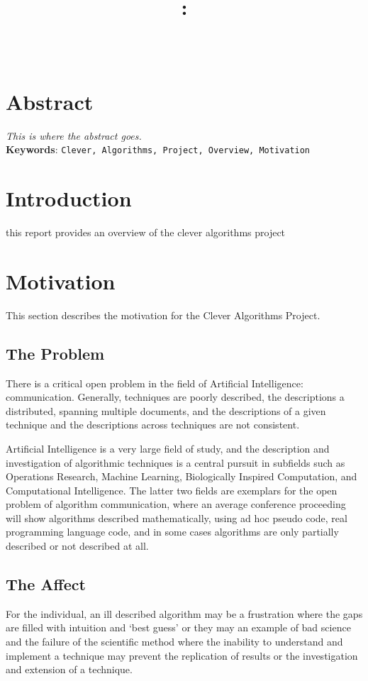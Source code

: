 \documentclass[a4paper, 11pt]{article}
\title{{\myreporttitle}: {\myreportsubtitle}\\{\normalsize\myreportproject}}
\author{\myreportname\\\myreportemail}
\begin{document}
\maketitle

\section*{Abstract} 
\label{sec:abstract}
\emph{This is where the abstract goes.}
\\
\textbf{Keywords}: \texttt{Clever, Algorithms, Project, Overview, Motivation}

\section{Introduction}
\label{sec:introduction}

this report provides an overview of the clever algorithms project

\section{Motivation}
This section describes the motivation for the Clever Algorithms Project.

\subsection{The Problem}
There is a critical open problem in the field of Artificial Intelligence: communication. Generally, techniques are poorly described, the descriptions a distributed, spanning multiple documents, and the descriptions of a given technique and the descriptions across techniques are not consistent. 

Artificial Intelligence is a very large field of study, and the description and investigation of algorithmic techniques is a central pursuit in subfields such as Operations Research, Machine Learning, Biologically Inspired Computation, and Computational Intelligence. The latter two fields are exemplars for the open problem of algorithm communication, where an average conference proceeding will show algorithms described mathematically, using ad hoc pseudo code, real programming language code, and in some cases algorithms are only partially described or not described at all. 

\subsection{The Affect}
For the individual, an ill described algorithm may be a frustration where the gaps are filled with intuition and `best guess' or they may an example of bad science and the failure of the scientific method where the inability to understand and implement a technique may prevent the replication of results or the investigation and extension of a technique. 
\end{document}
